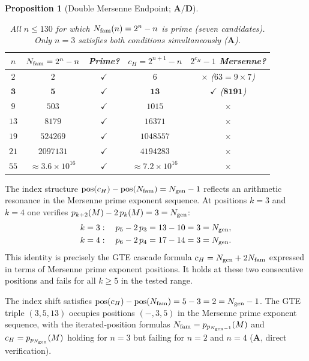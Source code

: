 \documentclass[11pt]{article}
\newtheorem{proposition}[theorem]{Proposition}
\theoremstyle{remark}
\newcommand{\Ngen}{N_{\rm gen}}
\newcommand{\Nfam}{N_{\rm fam}}
\newcommand{\cH}{c_H}
\newcommand{\CatA}{\textbf{A}}
\newcommand{\CatAD}{\textbf{A/D}}
\begin{document}
\begin{proposition}[Double Mersenne Endpoint; $\CatAD$]
\begin{table}[H]
\centering
\caption{All $n \leq 130$ for which $\Nfam(n) = 2^n - n$ is prime (seven candidates).
Only $n = 3$ satisfies both conditions simultaneously ($\CatA$).}
\label{tab:mersenne_candidates}
\small
\renewcommand{\arraystretch}{1.2}
\begin{tabular}{@{}ccccc@{}}
\toprule
$n$ & $\Nfam = 2^n - n$ & Prime? & $\cH = 2^{n+1} - n$ & $2^{\cH}-1$ Mersenne?\\
\midrule
$2$  & $2$      & $\checkmark$ & $6$   & $\times$ ($63 = 9\times7$)\\
$\mathbf{3}$  & $\mathbf{5}$ & $\checkmark$ & $\mathbf{13}$ & $\boldsymbol{\checkmark}$ ($\mathbf{8191}$)\\
$9$  & $503$    & $\checkmark$ & $1015$ & $\times$\\
$13$ & $8179$   & $\checkmark$ & $16371$ & $\times$\\
$19$ & $524269$ & $\checkmark$ & $1048557$ & $\times$\\
$21$ & $2097131$ & $\checkmark$ & $4194283$ & $\times$\\
$55$ & $\approx 3.6\times10^{16}$ & $\checkmark$ & $\approx 7.2\times10^{16}$ & $\times$\\
\bottomrule
\end{tabular}
\end{table}
\end{proposition}

The index structure $\mathrm{pos}(\cH) - \mathrm{pos}(\Nfam) = \Ngen - 1$ reflects
an arithmetic resonance in the Mersenne prime exponent sequence.  At positions
$k = 3$ and $k = 4$ one verifies $p_{k+2}(M) - 2\,p_k(M) = 3 = \Ngen$:
\begin{align*}
  k = 3:\quad p_5 - 2\,p_3 &= 13 - 10 = 3 = \Ngen,\\
  k = 4:\quad p_6 - 2\,p_4 &= 17 - 14 = 3 = \Ngen.
\end{align*}
This identity is precisely the GTE cascade formula $\cH = \Ngen + 2\Nfam$
expressed in terms of Mersenne prime exponent positions.
It holds at these two consecutive positions and fails for all $k \geq 5$
in the tested range.

The index shift satisfies $\mathrm{pos}(\cH) - \mathrm{pos}(\Nfam) = 5 - 3 = 2 = \Ngen - 1$.
The GTE triple $(3, 5, 13)$ occupies positions $(-,3,5)$ in the Mersenne prime exponent
sequence, with the iterated-position formulas $\Nfam = p_{p_{\Ngen-1}}(M)$
and $\cH = p_{p_{\Ngen}}(M)$ holding for $n = 3$ but failing for $n = 2$ and $n = 4$
($\CatA$, direct verification).
\end{document}
